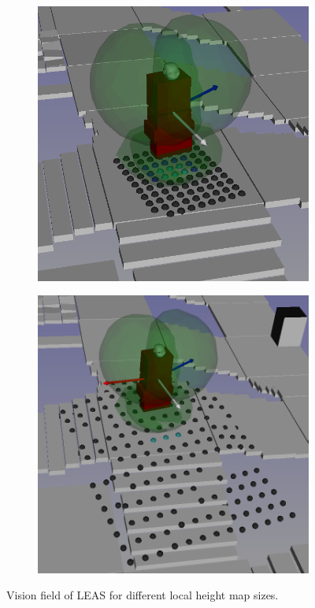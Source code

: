 \begin{figure}[h]
    \captionsetup[subfigure]{justification=centering}
    \begin{subfigure}[t]{.49\linewidth}
    \includegraphics[width=\textwidth]{Figures/Chapter_LEAS/hm_small_vision.png}
    \caption{\label{fig:vision_hm_size_short}}
    \end{subfigure}
    \begin{subfigure}[t]{.49\linewidth}
    \includegraphics[width=\textwidth]{Figures/Chapter_LEAS/hm_big_vision.png}
    \caption{\label{fig:vision_hm_size_big}}
    \end{subfigure}
    \caption{Vision field of LEAS for different local height map sizes.}
    \label{fig:vision_hm_size}
\end{figure}

